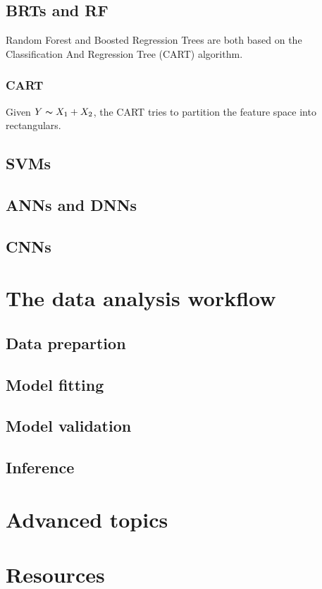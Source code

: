 \documentclass[a4paper,twoside]{tufte-book}\usepackage[]{graphicx}\usepackage[]{color}
\begin{document}
\section{BRTs and RF}
%
Random Forest \citep[RF,][]{Breiman2001a} and Boosted Regression Trees \citep[BRT,][]{Friedman2001} are both based on the Classification And Regression Tree (CART) algorithm.
%
\subsection{CART}
Given $Y \thicksim X_1 + X_2$, the CART tries to partition the feature space into rectangulars.




\section{SVMs}

\section{ANNs and DNNs}

\section{CNNs}



\chapter{The data analysis workflow}

\section{Data prepartion}

\section{Model fitting}

\section{Model validation}

\section{Inference}



\chapter{Advanced topics}


\chapter{Resources}




\end{document}
